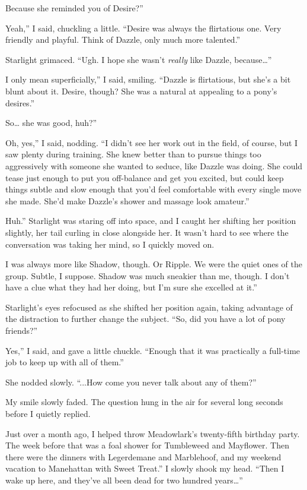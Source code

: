 \leavevmode{}Because she reminded you of Desire?”

\leavevmode{}Yeah,” I said, chuckling a little. “Desire was always the flirtatious one. Very friendly and playful. Think of Dazzle, only much more talented.”

Starlight grimaced. “Ugh. I hope she wasn’t \textit{really} like Dazzle, because…”

\leavevmode{}I only mean superficially,” I said, smiling. “Dazzle is flirtatious, but she’s a bit blunt about it. Desire, though? She was a natural at appealing to a pony’s desires.”

\leavevmode{}So… she was good, huh?”

\leavevmode{}Oh, yes,” I said, nodding. “I didn’t see her work out in the field, of course, but I saw plenty during training. She knew better than to pursue things too aggressively with someone she wanted to seduce, like Dazzle was doing. She could tease just enough to put you off-balance and get you excited, but could keep things subtle and slow enough that you’d feel comfortable with every single move she made. She’d make Dazzle’s shower and massage look amateur.”

\leavevmode{}Huh.” Starlight was staring off into space, and I caught her shifting her position slightly, her tail curling in close alongside her. It wasn’t hard to see where the conversation was taking her mind, so I quickly moved on.

\leavevmode{}I was always more like Shadow, though. Or Ripple. We were the quiet ones of the group. Subtle, I suppose. Shadow was much sneakier than me, though. I don’t have a clue what they had her doing, but I’m sure she excelled at it.”

Starlight’s eyes refocused as she shifted her position again, taking advantage of the distraction to further change the subject. “So, did you have a lot of pony friends?”

\leavevmode{}Yes,” I said, and gave a little chuckle. “Enough that it was practically a full-time job to keep up with all of them.”

She nodded slowly. “...How come you never talk about any of them?”

My smile slowly faded. The question hung in the air for several long seconds before I quietly replied.

\leavevmode{}Just over a month ago, I helped throw Meadowlark’s twenty-fifth birthday party. The week before that was a foal shower for Tumbleweed and Mayflower. Then there were the dinners with Legerdemane and Marblehoof, and my weekend vacation to Manehattan with Sweet Treat.” I slowly shook my head. “Then I wake up here, and they’ve all been dead for two hundred years…”

